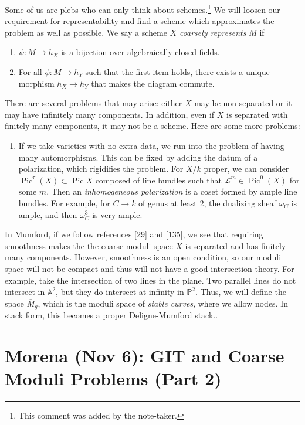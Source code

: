 \documentclass[leqno, openany]{memoir}
\theoremstyle{definition}
\theoremstyle{remark}
\theoremstyle{plain}
\theoremstyle{definition}
\theoremstyle{remark}
\newcommand{\A}{\mathbb{A}}
\renewcommand{\P}{\mathbb{P}}
\newcommand{\mc}[1]{\mathcal{#1}}
\newcommand{\ol}[1]{\overline{#1}}
\DeclareMathOperator{\Pic}{Pic}
\begin{document}
    
    Some of us are plebs who can only think about schemes.\footnote{This comment was added by the note-taker.} We will loosen our requirement for representability and find a scheme which approximates the problem as well as possible. We say a scheme $X$ \textit{coarsely represents} $M$ if 
    \begin{enumerate}
        \item $\psi \colon M \to h_X$ is a bijection over algebraically closed fields.
        \item For all $\phi \colon M \to h_Y$ such that the first item holds, there exists a unique morphism $h_X \to h_Y$ that makes the diagram commute.
    \end{enumerate}

    There are several problems that may arise: either $X$ may be non-separated or it may have infinitely many components. In addition, even if $X$ is separated with finitely many components, it may not be a scheme. Here are some more problems:
    \begin{enumerate}
        \item If we take varieties with no extra data, we run into the problem of having many automorphisms. This can be fixed by adding the datum of a polarization, which rigidifies the problem. For $X/k$ proper, we can consider $\Pic^{\tau}(X) \subset \Pic X$ composed of line bundles such that $\mc{L}^m \in \Pic^0(X)$ for some $m$. Then an \textit{inhomogeneous polarization} is a coset formed by ample line bundles. For example, for $C \to k$ of genus at least $2$, the dualizing sheaf $\omega_C$ is ample, and then $\omega_C^3$ is very ample.  
    \end{enumerate}
In Mumford, if we follow references [29] and [135], we see that requiring smoothness makes the the coarse moduli space $X$ is separated and has finitely many components. However, smoothness is an open condition, so our moduli space will not be compact and thus will not have a good intersection theory. For example, take the intersection of two lines in the plane. Two parallel lines do not intersect in $\A^2$, but they do intersect at infinity in $\P^2$. Thus, we will define the space $\ol{M}_g$, which is the moduli space of \textit{stable curves}, where we allow nodes. In stack form, this becomes a proper Deligne-Mumford stack.. 

\chapter{Morena (Nov 6): GIT and Coarse Moduli Problems (Part 2)}%
\label{cha:morena_nov_6_git_and_coarse_moduli_problems_part_2_}
\end{document}
